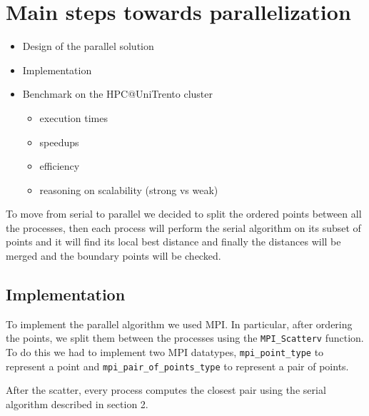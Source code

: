 \section{Main steps towards parallelization}
\label{sec:parallelization}

\begin{itemize}
  \item Design of the parallel solution
  \item Implementation
  \item Benchmark on the HPC@UniTrento cluster
  \begin{itemize}
    \item execution times
    \item speedups
    \item efficiency
    \item reasoning on scalability (strong vs weak)
\end{itemize}
\end{itemize}

To move from serial to parallel we decided to split the ordered
points between all the processes, then each process will perform
the serial algorithm on its subset of points and it will find its local best distance and
finally the distances will be merged and the boundary points will be checked.

\subsection*{Implementation}
To implement the parallel algorithm we used MPI.
In particular, after ordering the points, we split them between the processes using the \verb+MPI_Scatterv+ function.
To do this we had to implement two MPI datatypes, \verb+mpi_point_type+ to represent a point and \verb+mpi_pair_of_points_type+
to represent a pair of points.

After the scatter, every process computes the closest pair using the serial algorithm described in section 2.
